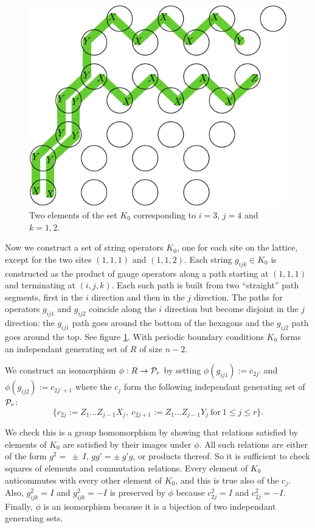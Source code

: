 \documentclass[12pt,notitlepage,longbibliography,nofootinbib,tightenlines]{revtex4}
\begin{document}
\begin{figure}[th!]
\begin{center}
        \includegraphics[width=0.5\columnwidth]{fig_01.pdf}
\caption{Two elements of the set $K_0$ corresponding
to $i=3$, $j=4$ and $k=1,2.$}
\label{jaws}
\end{center}
\end{figure}

Now we construct a set of string operators $K_0$,
one for each site on the lattice, except for
the two sites $(1,1,1)$ and $(1,1,2).$
Each string $g_{ijk}\in K_0$
is constructed as the product of
gauge operators along a path starting at
$(1,1,1)$ and terminating at $(i,j,k).$
Each such path is built from two ``straight''
path segments, first in the $i$ direction
and then in the $j$ direction. 
The paths for operators $g_{ij1}$ and
$g_{ij2}$ coincide along the $i$ direction
but become disjoint in the $j$ direction:
the $g_{ij1}$ path goes around the bottom
of the hexagons and the $g_{ij2}$ path
goes around the top.
See figure \ref{jaws}.
With periodic boundary conditions $K_0$ forms an
independant generating set of $R$ of size $n-2.$

We construct an isomorphism $\phi: R\to \mathcal{P}_r$
by setting $\phi(g_{ij1}):=c_{2j'}$
and $\phi(g_{ij2}):=c_{2j'+1}$
where the $c_j$ form the following independant generating
set of $\mathcal{P}_r$:
$$
\big\{c_{2j}:=Z_1...Z_{j-1} X_j,\ c_{2j+1}:=Z_1...Z_{j-1} Y_j\ \mbox{for}\ 1\le j\le r\big\}.
$$

We check this is a group homomorphism by showing that relations
satisfied by elements of $K_0$ are satisfied by
their images under $\phi.$
All such relations are either of the form
$g^2=~\pm~I$, $gg'=\pm~g'g$, or
products thereof.
So it is sufficient to check squares of
elements and commutation relations.
Every element of $K_0$ anticommutes with
every other element of $K_0$, and this is true also
of the $c_j.$
Also, $g_{ijk}^2=I$ and $g_{ijk}^2=-I$ 
is preserved by $\phi$ because $c_{2j}^2=I$ and $c_{2j}^2=-I$.
Finally, $\phi$ is an isomorphism
because it is a bijection of two independant
generating sets.
\end{document}
